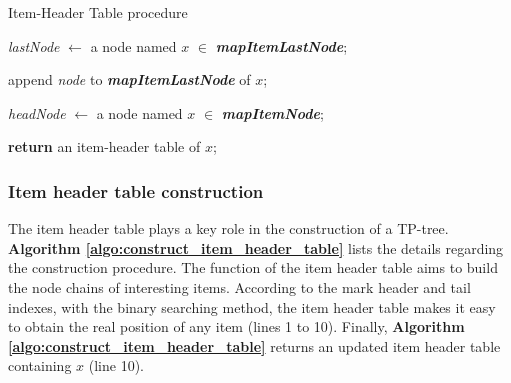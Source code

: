 \documentclass[journal]{IEEEtran}
\begin{document}
\begin{algorithm}
	\caption{Item-Header Table procedure}
	\label{algo:construct_item_header_table}
	\LinesNumbered
	
	\textit{lastNode} $\leftarrow$ a node named $x$ $\in$ \textit{\textbf{mapItemLastNode}};
	
	
	append \textit{node} to \textit{\textbf{mapItemLastNode}} of $x$;
	
	\textit{headNode} $\leftarrow$ a node named $x$ $\in$ \textit{\textbf{mapItemNode}};
	
	\textbf{return} an item-header table of $x$;
\end{algorithm}


\subsubsection{Item header table construction}

The item header table plays a key role in the construction of a TP-tree. \textbf{Algorithm \ref{algo:construct_item_header_table}} lists the details regarding the construction procedure. The function of the item header table aims to build the node chains of interesting items. According to the mark header and tail indexes, with the binary searching method, the item header table makes it easy to obtain the real position of any item (lines 1 to 10). Finally, \textbf{Algorithm \ref{algo:construct_item_header_table}} returns an updated item header table containing $x$ (line 10).
\end{document}
